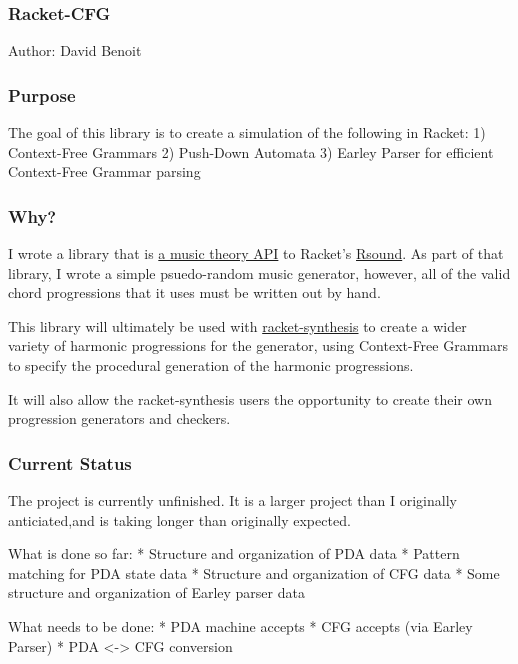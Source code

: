 \subsubsection{Racket-CFG}\label{racket-cfg}

Author: David Benoit

\subsubsection{Purpose}\label{purpose}

The goal of this library is to create a simulation of the following in
Racket: 1) Context-Free Grammars 2) Push-Down Automata 3) Earley Parser
for efficient Context-Free Grammar parsing

\subsubsection{Why?}\label{why}

I wrote a library that is
\href{https://github.com/benoid/racket-synthesis}{a music theory API} to
Racket's \href{https://github.com/jbclements/RSound}{Rsound}. As part of
that library, I wrote a simple psuedo-random music generator, however,
all of the valid chord progressions that it uses must be written out by
hand.

This library will ultimately be used with
\href{https://github.com/benoid/racket-synthesis}{racket-synthesis} to
create a wider variety of harmonic progressions for the generator, using
Context-Free Grammars to specify the procedural generation of the
harmonic progressions.

It will also allow the racket-synthesis users the opportunity to create
their own progression generators and checkers.

\subsubsection{Current Status}\label{current-status}

The project is currently unfinished. It is a larger project than I
originally anticiated,and is taking longer than originally expected.

What is done so far: * Structure and organization of PDA data * Pattern
matching for PDA state data * Structure and organization of CFG data *
Some structure and organization of Earley parser data

What needs to be done: * PDA machine accepts * CFG accepts (via Earley
Parser) * PDA \textless{}-\textgreater{} CFG conversion

